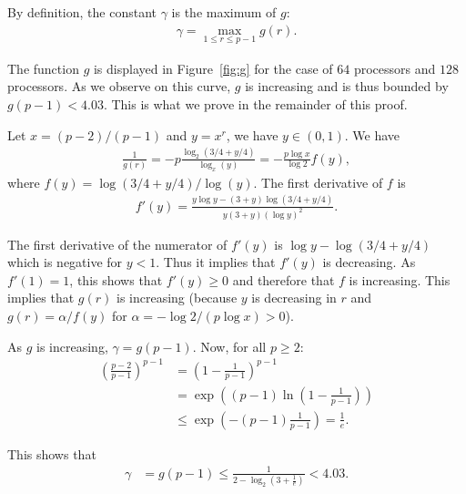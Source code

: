    By definition, the constant $\gamma$ is the maximum of $g$:
   \begin{align*}
     \gamma=\max_{1\le r \le p-1}g(r).  
   \end{align*}
   
   The function $g$ is displayed in Figure~\ref{fig:g} for the case of
   $64$ processors and $128$ processors. As we observe on this curve,
   $g$ is increasing and is thus bounded by $g(p-1)<4.03$.  This is what we
   prove in the remainder of this proof.

   Let $x=(p-2)/(p-1)$ and $y=x^r$, we have $y\in(0,1)$. We have
   \begin{align*}
     \frac{1}{g(r)} = -p\frac{\log_2(3/4+y/4)}{\log_x(y)} =
     -\frac{p\log x}{\log 2} f(y),
   \end{align*}
   where $f(y)=\log(3/4+y/4)/\log(y)$. The first derivative of $f$ is
   \begin{align*}
     f'(y)=\frac{y\log y - (3+y)\log(3/4+y/4)}{y(3+y)(\log y)^2}.
   \end{align*}
   
   The first derivative of the numerator of $f'(y)$ is
   $\log y - \log (3/4+y/4)$ which is negative for $y<1$. Thus it implies
   that $f'(y)$ is decreasing. As $f'(1)=1$, this shows that
   $f'(y)\ge0$ and therefore that $f$ is increasing. This implies that
   $g(r)$ is increasing (because $y$ is decreasing in $r$ and
   $g(r)=\alpha /f(y)$ for $\alpha=-\log 2 / (p\log x) > 0$).

   As $g$ is increasing, $\gamma = g(p-1)$. Now, for all $ p \geq 2$:
   \begin{align*}
       \left(\frac{p-2}{p-1}\right)^{p-1} & = \left( 1 - \frac{1}{p-1}
     \right)^{p-1}\\
       &= \exp \left((p-1)\ln(1-\frac{1}{p-1}) \right)\\
                     &\leq \exp \left(-(p-1)\frac{1}{p-1} \right) = \frac{1}{e} .
   \end{align*}
   
   This shows that 
      \begin{align*}
     \gamma &= g(p-1) \leq \frac{1}{ 2 - \log_2\left(3 + \frac{1}{e}
              \right)} <  4.03.
   \end{align*}

